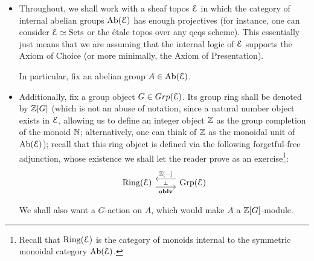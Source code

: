                    \begin{convention}
                        \noindent
                        \begin{itemize}
                            \item Throughout, we shall work with a sheaf topos $\mathcal{E}$ in which the category of internal abelian groups $\mathrm{Ab}(\mathcal{E})$ has enough projectives (for instance, one can consider $\mathcal{E} \simeq \mathrm{Sets}$ or the \'etale topos over any qcqs scheme). This essentially just means that we are assuming that the internal logic of $\mathcal{E}$ supports the Axiom of Choice (or more minimally, the Axiom of Presentation). 
                            
                            In particular, fix an abelian group $A \in \mathrm{Ab}(\mathcal{E})$.
                            \item Additionally, fix a group object $G \in Grp(\mathcal{E})$. Its group ring shall be denoted by $\mathbb{Z}[G]$ (which is not an abuse of notation, since a natural number object exists in $\mathcal{E}$, allowing us to define an integer object $\mathbb{Z}$ as the group completion of the monoid $\mathbb{N}$; alternatively, one can think of $\mathbb{Z}$ as the monoidal unit of $\mathrm{Ab}(\mathcal{E})$); recall that this ring object is defined via the following forgetful-free adjunction, whose existence we shall let the reader prove as an exercise\footnote{Recall that $\mathrm{Ring}(\mathcal{E})$ is the category of monoids internal to the symmetric monoidal category $\mathrm{Ab}(\mathcal{E})$.}:
                                $$
                                    \begin{tikzcd}
                                    	{\Ring(\E)} & {\Grp(\E)}
                                    	\arrow[""{name=0, anchor=center, inner sep=0}, "\oblv"', shift right=2, from=1-1, to=1-2]
                                    	\arrow[""{name=1, anchor=center, inner sep=0}, "{\Z[-]}"', shift right=2, from=1-2, to=1-1]
                                    	\arrow["\dashv"{anchor=center, rotate=-90}, draw=none, from=1, to=0]
                                    \end{tikzcd}
                                $$
                                
                            We shall also want a $G$-action on $A$, which would make $A$ a $\mathbb{Z}[G]$-module.
                        \end{itemize}
                    \end{convention}
                    
